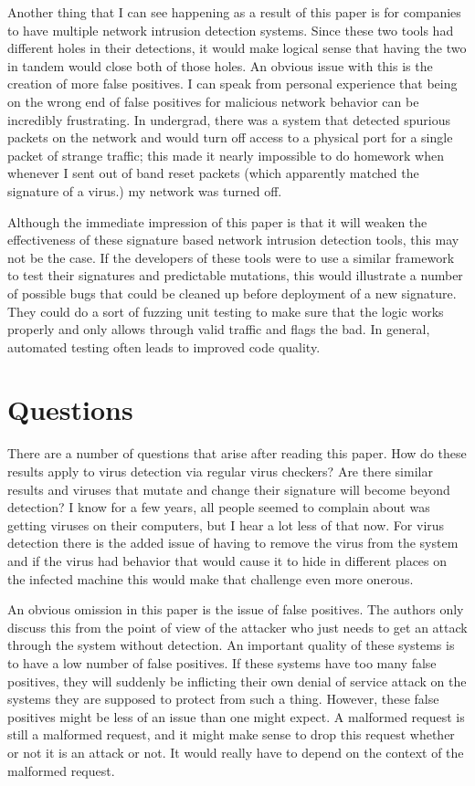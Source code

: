 \documentclass{reading_glasses}
\begin{document}
Another thing that I can see happening as a result of this paper is for companies to have multiple network intrusion detection systems.  Since these two tools had different holes in their detections, it would make logical sense that having the two in tandem would close both of those holes.  An obvious issue with this is the creation of more false positives.  I can speak from personal experience that being on the wrong end of false positives for malicious network behavior can be incredibly frustrating.  In undergrad, there was a system that detected spurious packets on the network and would turn off access to a physical port for a single packet of strange traffic; this made it nearly impossible to do homework when whenever I sent out of band reset packets (which apparently matched the signature of a virus.) my network was turned off.

Although the immediate impression of this paper is that it will weaken the effectiveness of these signature based network intrusion detection tools, this may not be the case.  If the developers of these tools were to use a similar framework to test their signatures and predictable mutations, this would illustrate a number of possible bugs that could be cleaned up before deployment of a new signature.  They could do a sort of fuzzing unit testing to make sure that the logic works properly and only allows through valid traffic and flags the bad.  In general, automated testing often leads to improved code quality.

\section{Questions}
There are a number of questions that arise after reading this paper.  How do these results apply to virus detection via regular virus checkers?  Are there similar results and viruses that mutate and change their signature will become beyond detection?  I know for a few years, all people seemed to complain about was getting viruses on their computers, but I hear a lot less of that now.  For virus detection there is the added issue of having to remove the virus from the system and if the virus had behavior that would cause it to hide in different places on the infected machine this would make that challenge even more onerous.  

An obvious omission in this paper is the issue of false positives.  The authors only discuss this from the point of view of the attacker who just needs to get an attack through the system without detection.  An important quality of these systems is to have a low number of false positives.  If these systems have too many false positives, they will suddenly be inflicting their own denial of service attack on the systems they are supposed to protect from such a thing.  However, these false positives might be less of an issue than one might expect.  A malformed request is still a malformed request, and it might make sense to drop this request whether or not it is an attack or not.  It would really have to depend on the context of the malformed request.




\end{document}
